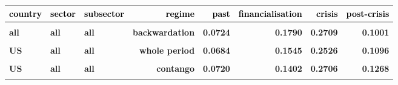 \documentclass[
  authoryear,
  preprint,
  3p]{elsarticle}
\begin{document}
\begin{longtable}[t]{>{}l>{}l>{}l>{}r>{}r>{}r>{}r>{}r}
\toprule
\textcolor{black}{\textbf{country}} & \textcolor{black}{\textbf{sector}} & \textcolor{black}{\textbf{subsector}} & \textcolor{black}{\textbf{regime}} & \textcolor{black}{\textbf{past}} & \textcolor{black}{\textbf{financialisation}} & \textcolor{black}{\textbf{crisis}} & \textcolor{black}{\textbf{post-crisis}}\\
\midrule
\textbf{\cellcolor{gray!10}{all}} & \textbf{\cellcolor{gray!10}{all}} & \textbf{\cellcolor{gray!10}{all}} & \textbf{\cellcolor{gray!10}{whole period}} & \textcolor[HTML]{4285f4}{\textbf{\cellcolor{gray!10}{0.0737}}} & \textcolor[HTML]{4285f4}{\textbf{\cellcolor{gray!10}{0.1638}}} & \textcolor[HTML]{4285f4}{\textbf{\cellcolor{gray!10}{0.2849}}} & \textcolor[HTML]{4285f4}{\textbf{\cellcolor{gray!10}{0.1282}}}\\
\textbf{all} & \textbf{all} & \textbf{all} & \textbf{backwardation} & \textcolor[HTML]{4285f4}{\textbf{0.0724}} & \textcolor[HTML]{4285f4}{\textbf{0.1790}} & \textcolor[HTML]{4285f4}{\textbf{0.2709}} & \textcolor[HTML]{4285f4}{\textbf{0.1001}}\\
\textbf{\cellcolor{gray!10}{all}} & \textbf{\cellcolor{gray!10}{all}} & \textbf{\cellcolor{gray!10}{all}} & \textbf{\cellcolor{gray!10}{contango}} & \textcolor[HTML]{4285f4}{\textbf{\cellcolor{gray!10}{0.0748}}} & \textcolor[HTML]{4285f4}{\textbf{\cellcolor{gray!10}{0.1501}}} & \textcolor[HTML]{4285f4}{\textbf{\cellcolor{gray!10}{0.2985}}} & \textcolor[HTML]{4285f4}{\textbf{\cellcolor{gray!10}{0.1495}}}\\
\textbf{US} & \textbf{all} & \textbf{all} & \textbf{whole period} & \textcolor[HTML]{4285f4}{\textbf{0.0684}} & \textcolor[HTML]{4285f4}{\textbf{0.1545}} & \textcolor[HTML]{4285f4}{\textbf{0.2526}} & \textcolor[HTML]{4285f4}{\textbf{0.1096}}\\
\textbf{\cellcolor{gray!10}{US}} & \textbf{\cellcolor{gray!10}{all}} & \textbf{\cellcolor{gray!10}{all}} & \textbf{\cellcolor{gray!10}{backwardation}} & \textcolor[HTML]{4285f4}{\textbf{\cellcolor{gray!10}{0.0642}}} & \textcolor[HTML]{4285f4}{\textbf{\cellcolor{gray!10}{0.1697}}} & \textcolor[HTML]{4285f4}{\textbf{\cellcolor{gray!10}{0.2323}}} & \textcolor[HTML]{4285f4}{\textbf{\cellcolor{gray!10}{0.0859}}}\\
\addlinespace
\textbf{US} & \textbf{all} & \textbf{all} & \textbf{contango} & \textcolor[HTML]{4285f4}{\textbf{0.0720}} & \textcolor[HTML]{4285f4}{\textbf{0.1402}} & \textcolor[HTML]{4285f4}{\textbf{0.2706}} & \textcolor[HTML]{4285f4}{\textbf{0.1268}}\\
\textbf{\cellcolor{gray!10}{US}} & \textbf{\cellcolor{gray!10}{agriculturals}} & \textbf{\cellcolor{gray!10}{all}} & \textbf{\cellcolor{gray!10}{whole period}} & \textcolor[HTML]{4285f4}{\textbf{\cellcolor{gray!10}{0.0910}}} & \textcolor[HTML]{4285f4}{\textbf{\cellcolor{gray!10}{0.1305}}} & \textcolor[HTML]{4285f4}{\textbf{\cellcolor{gray!10}{0.2322}}} & \textcolor[HTML]{4285f4}{\textbf{\cellcolor{gray!10}{0.1075}}}\\

\end{longtable}
\end{document}
